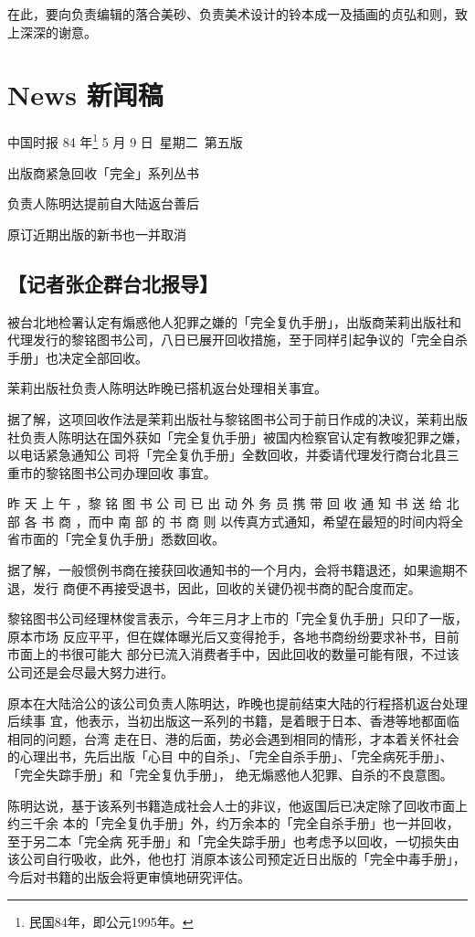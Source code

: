 \documentclass[UTF8]{ctexart}
\begin{document}
在此，要向负责编辑的落合美砂、负责美术设计的铃本成一及插画的贞弘和则，致上深深的谢意。


\newpage

\section{News 新闻稿}

中国时报 84 年\footnote{民国84年，即公元1995年。} 5 月 9 日\ 星期二\ 第五版

出版商紧急回收「完全」系列丛书

负责人陈明达提前自大陆返台善后

原订近期出版的新书也一并取消

\subsection*{【记者张企群台北报导】}

被台北地检署认定有煽惑他人犯罪之嫌的「完全复仇手册」，出版商茉莉出版社和代理发行的黎铭图书公司，八日已展开回收措施，至于同样引起争议的「完全自杀手册」也决定全部回收。

茉莉出版社负责人陈明达昨晚已搭机返台处理相关事宜。

据了解，这项回收作法是茉莉出版社与黎铭图书公司于前日作成的决议，茉莉出版社负责人陈明达在国外获如「完全复仇手册」被国内检察官认定有教唆犯罪之嫌，以电话紧急通知公 司将「完全复仇手册」全数回收，并委请代理发行商台北县三重市的黎铭图书公司办理回收 事宜。

昨 天 上 午 ，黎 铭 图 书 公 司 已 出 动 外 务 员 携 带 回 收 通 知 书 送 给 北 部 各 书 商 ，而中 南 部 的 书 商 则 以传真方式通知，希望在最短的时间内将全省市面的「完全复仇手册」悉数回收。

据了解，一般惯例书商在接获回收通知书的一个月内，会将书籍退还，如果逾期不退，发行
商便不再接受退书，因此，回收的关键仍视书商的配合度而定。

黎铭图书公司经理林俊言表示，今年三月才上市的「完全复仇手册」只印了一版，原本市场
反应平平，但在媒体曝光后又变得抢手，各地书商纷纷要求补书，目前市面上的书很可能大
部分已流入消费者手中，因此回收的数量可能有限，不过该公司还是会尽最大努力进行。

原本在大陆洽公的该公司负责人陈明达，昨晚也提前结束大陆的行程搭机返台处理后续事 宜，他表示，当初出版这一系列的书籍，是着眼于日本、香港等地都面临相同的问题，台湾 走在日、港的后面，势必会遇到相同的情形，才本着关怀社会的心理出书，先后出版「心目 中的自杀」、「完全自杀手册」、「完全病死手册」、「完全失踪手册」和「完全复仇手册」， 绝无煽惑他人犯罪、自杀的不良意图。

陈明达说，基于该系列书籍造成社会人士的非议，他返国后已决定除了回收市面上约三千余 本的「完全复仇手册」外，约万余本的「完全自杀手册」也一并回收，至于另二本「完全病 死手册」和「完全失踪手册」也考虑予以回收，一切损失由该公司自行吸收，此外，他也打 消原本该公司预定近日出版的「完全中毒手册」，今后对书籍的出版会将更审慎地研究评估。
\end{document}
